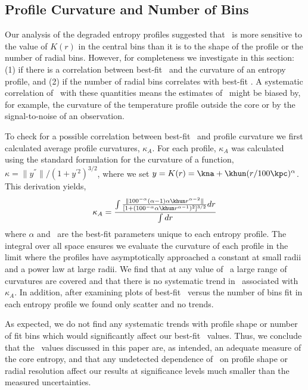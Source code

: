 \documentclass{emulateapj}
\begin{document}
\subsection{Profile Curvature and Number of Bins}
\label{sec:curve}

Our analysis of the degraded entropy profiles suggested that \kna\ is
more sensitive to the value of $K(r)$ in the central bins than it is
to the shape of the profile or the number of radial bins. However, for
completeness we investigate in this section: (1) if there is a
correlation between best-fit \kna\ and the curvature of an entropy
profile, and (2) if the number of radial bins correlates with best-fit
\kna. A systematic correlation of \kna\ with these quantities means
the estimates of \kna\ might be biased by, for example, the curvature
of the temperature profile outside the core or by the signal-to-noise
of an observation.

To check for a possible correlation between best-fit \kna\ and profile
curvature we first calculated average profile curvatures,
$\kappa_A$. For each profile, $\kappa_A$ was calculated using the
standard formulation for the curvature of a function, $\kappa =
\|y^{''}\|/(1+y^{'2})^{3/2}$, where we set $y = K(r) =
\kna+\khun(r/100\kpc)^{\alpha}$. This derivation yields,
\begin{equation}
\kappa_A = \frac{\int\frac{\| 100^{-\alpha} (\alpha-1) \alpha \khun
  r^{\alpha-2}\|}{[1+(100^{-\alpha} \alpha \khun
    r^{\alpha-1})^2]^{3/2}} dr}{\int dr}
\end{equation}
where $\alpha$ and \khun\ are the best-fit parameters unique to each
entropy profile. The integral over all space ensures we evaluate the
curvature of each profile in the limit where the profiles have
asymptotically approached a constant at small radii and a power law at
large radii. We find that at any value of \kna\ a large range of
curvatures are covered and that there is no systematic trend in
\kna\ associated with $\kappa_A$. In addition, after examining plots
of best-fit \kna\ versus the number of bins fit in each entropy
profile we found only scatter and no trends.

As expected, we do not find any systematic trends with profile shape
or number of fit bins which would significantly affect our best-fit
\kna\ values. Thus, we conclude that the \kna\ values discussed in
this paper are, as intended, an adequate measure of the core entropy,
and that any undetected dependence of \kna\ on profile shape or radial
resolution affect our results at significance levels much smaller than
the measured uncertainties.
\end{document}
